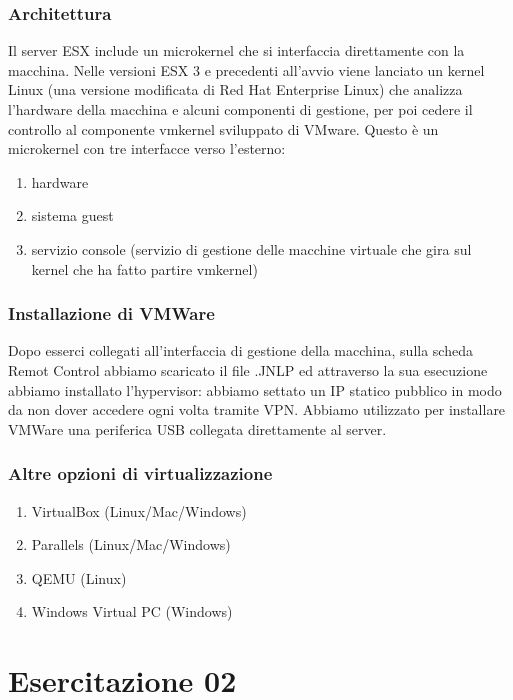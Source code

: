 \documentclass{article}
\begin{document}
\subsubsection{Architettura}
Il server ESX include un microkernel che si interfaccia direttamente con la macchina. Nelle versioni ESX 3 e precedenti all'avvio viene lanciato un kernel Linux (una versione modificata di Red Hat Enterprise Linux) che analizza l'hardware della macchina e alcuni componenti di gestione, per poi cedere il controllo al componente vmkernel sviluppato di VMware. Questo è un microkernel con tre interfacce verso l'esterno:
\begin{enumerate}
    \item hardware
    \item sistema guest
    \item servizio console (servizio di gestione delle macchine virtuale che gira sul kernel che ha fatto partire vmkernel)
\end{enumerate}

\subsubsection{Installazione di VMWare} 
    Dopo esserci collegati all'interfaccia di gestione della macchina, sulla scheda Remot Control abbiamo scaricato il file .JNLP ed attraverso la sua esecuzione
    abbiamo installato l'hypervisor: abbiamo settato un IP statico pubblico in modo da non dover
    accedere ogni volta tramite VPN. Abbiamo utilizzato per installare VMWare una periferica USB collegata direttamente al server.
    
\subsubsection{Altre opzioni di virtualizzazione}
\begin{enumerate}
    \item VirtualBox (Linux/Mac/Windows)
    \item Parallels (Linux/Mac/Windows)
    \item QEMU (Linux)
    \item Windows Virtual PC (Windows)
\end{enumerate}

\section{Esercitazione 02}
\end{document}
